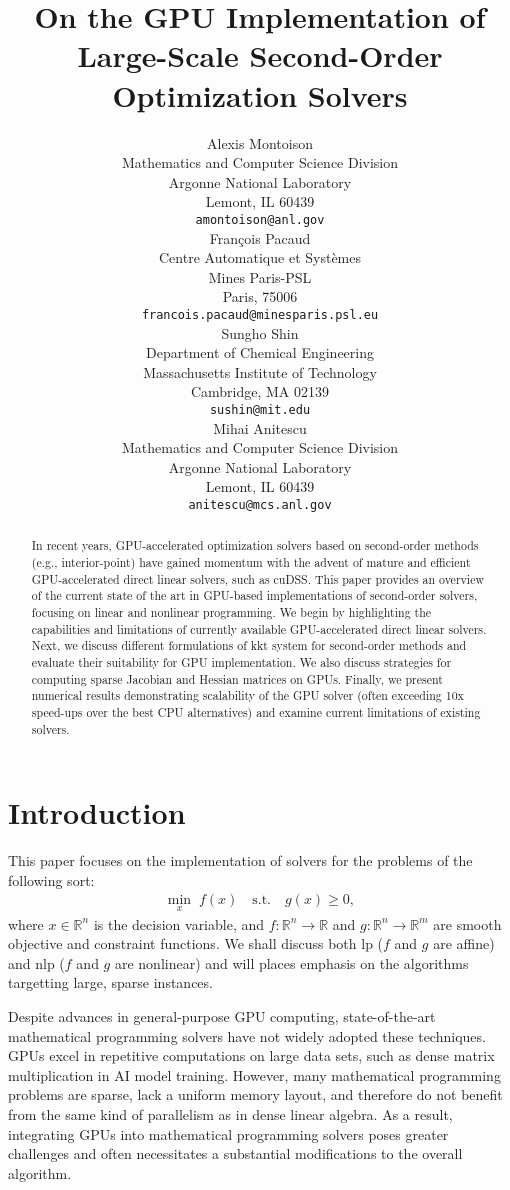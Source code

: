 \documentclass{article}
\title{On the GPU Implementation of Large-Scale Second-Order Optimization Solvers}
\author{%
  Alexis Montoison\\
  Mathematics and Computer Science Division\\
  Argonne National Laboratory\\
  Lemont, IL 60439\\
  \texttt{amontoison@anl.gov}\\
  \And
  Fran\c{c}ois Pacaud\\
  Centre Automatique et Systèmes\\
  Mines Paris-PSL\\
  Paris, 75006 \\
  \texttt{francois.pacaud@minesparis.psl.eu}\\
  \And
  Sungho Shin\\
  Department of Chemical Engineering\\
  Massachusetts Institute of Technology\\
  Cambridge, MA 02139\\
  \texttt{sushin@mit.edu}\\
  \And
  Mihai Anitescu\\
  Mathematics and Computer Science Division\\
  Argonne National Laboratory\\
  Lemont, IL 60439\\
  \texttt{anitescu@mcs.anl.gov}\\
}
\begin{document}
\maketitle


\begin{abstract}
In recent years, GPU-accelerated optimization solvers based on second-order methods (e.g., interior-point) have gained momentum with the advent of mature and efficient GPU-accelerated direct linear solvers, such as cuDSS.
This paper provides an overview of the current state of the art in GPU-based implementations of second-order solvers, focusing on linear and nonlinear programming.
We begin by highlighting the capabilities and limitations of currently available GPU-accelerated direct linear solvers. 
Next, we discuss different formulations of \gls*{kkt} system for second-order methods and evaluate their suitability for GPU implementation.
We also discuss strategies for computing sparse Jacobian and Hessian matrices on GPUs.
Finally, we present numerical results demonstrating scalability of the GPU solver (often exceeding 10x speed-ups over the best CPU alternatives) and examine current limitations of existing solvers.
\end{abstract}

\section{Introduction}\label{eqn:intro}

This paper focuses on the implementation of solvers for the problems of the following sort:
\begin{align}\label{eqn:opt}
  \min_{x } \; f(x) \quad \text{s.t.} \quad g(x) \geq 0,
\end{align}
where \(x \in \mathbb{R}^n\) is the decision variable, and \(f: \mathbb{R}^n \to \mathbb{R}\) and \(g: \mathbb{R}^n \to \mathbb{R}^m\) are smooth objective and constraint functions.
We shall discuss both \gls*{lp} ($f$ and $g$ are affine) and \gls*{nlp} ($f$ and $g$ are nonlinear) and will places emphasis on the algorithms targetting large, sparse instances.

Despite advances in general-purpose GPU computing, state-of-the-art mathematical programming solvers have not widely adopted these techniques.
GPUs excel in repetitive computations on large data sets, such as dense matrix multiplication in AI model training.
However, many mathematical programming problems are sparse, lack a uniform memory layout, and therefore do not benefit from the same kind of parallelism as in dense linear algebra.
As a result, integrating GPUs into mathematical programming solvers poses greater challenges and often necessitates a substantial modifications to the overall algorithm.
\end{document}

